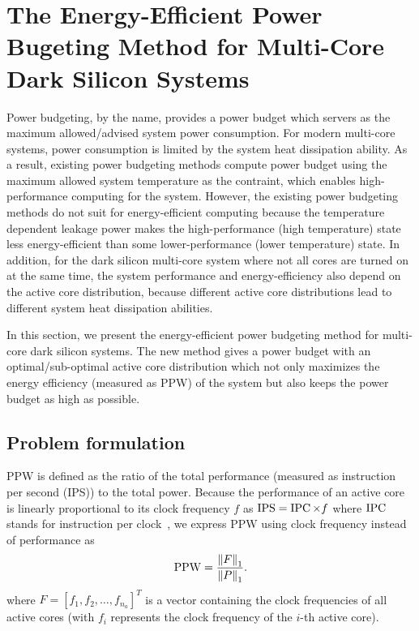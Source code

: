 \section{The Energy-Efficient Power Bugeting Method for Multi-Core
  Dark Silicon Systems}

Power budgeting, by the name, provides a power budget which servers
as the maximum allowed/advised system power consumption. For modern multi-core
systems, power consumption is limited by the system heat dissipation
ability. As a result, existing power budgeting methods compute power budget using the maximum
allowed system temperature as the contraint, which enables
high-performance computing for the system. However, the existing power
budgeting methods do not suit for energy-efficient computing
because the temperature dependent leakage power makes the high-performance
(high temperature) state less energy-efficient than some lower-performance
(lower temperature) state. 
In addition, for the dark silicon
multi-core system where not all cores are turned on at the same time,
the system performance and energy-efficiency also depend on the active core distribution, because
different active core distributions lead to different system heat
dissipation abilities.

In this section, we present the energy-efficient power budgeting
method for multi-core dark silicon systems. 
The new method gives a power budget with an optimal/sub-optimal active core distribution which not only maximizes the
energy efficiency (measured as PPW) of the system but also keeps the power budget as high as possible.



\subsection{Problem formulation}
PPW is defined as the ratio of the total performance (measured as
instruction per second (IPS)) to the
total power. Because the performance of an active core is linearly
proportional to its clock frequency $f$ as $\operatorname{IPS} = \operatorname{IPC} \times f$ where
$\operatorname{IPC}$ stands for instruction per
clock~\cite{Hennessy:Book'12},
we express PPW using clock frequency instead of performance as
\begin{equation}\label{eq:ppw}
\ppw = \frac{\left \| F \right \|_{1}}{\left \| P \right \|_{1}}.
\end{equation}
where $F = [f_1, f_2, \ldots, f_{n_a}]^T$ is a vector containing the
clock frequencies of all active cores (with $f_i$ represents the clock
frequency of the $i$-th active core). 

